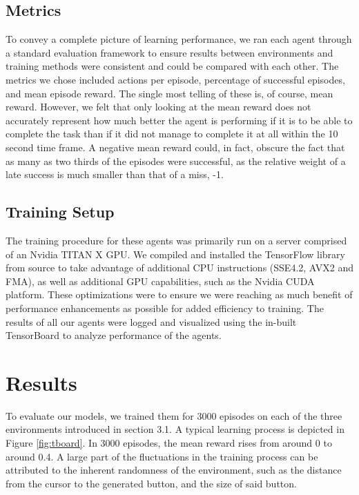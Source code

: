 \documentclass[10pt,journal,compsoc]{IEEEtran}
\begin{document}
\subsection{Metrics}
To convey a complete picture of learning performance, we ran each agent through a standard evaluation framework to ensure results between environments and training methods were consistent and could be compared with each other. The metrics we chose included actions per episode, percentage of successful episodes, and mean episode reward. The single most telling of these is, of course, mean reward. However, we felt that only looking at the mean reward does not accurately represent how much better the agent is performing if it is to be able to complete the task than if it did not manage to complete it at all within the 10 second time frame. A negative mean reward could, in fact, obscure the fact that as many as two thirds of the episodes were successful, as the relative weight of a late success is much smaller than that of a miss, -1.

\subsection{Training Setup}
The training procedure for these agents was primarily run on a server comprised of an Nvidia TITAN X GPU. We compiled and installed the TensorFlow library from source to take advantage of additional CPU instructions (SSE4.2, AVX2 and FMA), as well as additional GPU capabilities, such as the Nvidia CUDA platform. These optimizations were to ensure we were reaching as much benefit of performance enhancements as possible for added efficiency to training. The results of all our agents were logged and visualized using the in-built TensorBoard to analyze performance of the agents.


\section{Results}

To evaluate our models, we trained them for 3000 episodes on each of the three environments introduced in section 3.1. A typical learning process is depicted in Figure \ref{fig:tboard}. In 3000 episodes, the mean reward rises from around 0 to around 0.4. A large part of the fluctuations in the training process can be attributed to the inherent randomness of the environment, such as the distance from the cursor to the generated button, and the size of said button.  
\end{document}
